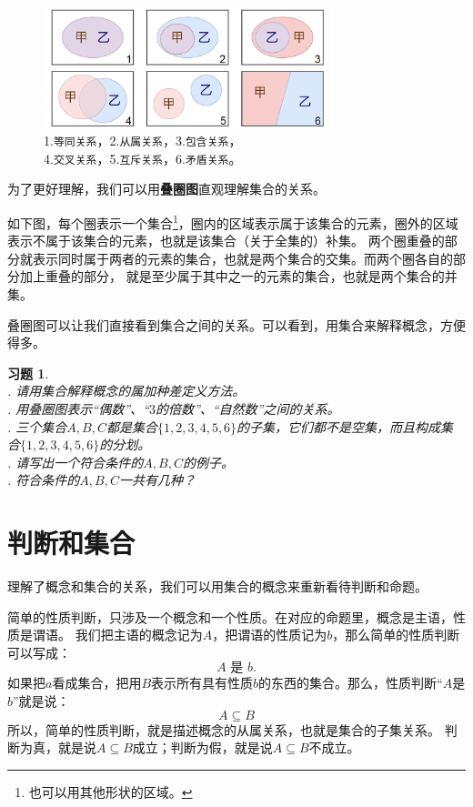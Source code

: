 \documentclass[12pt,UTF8]{ctexbook}
\newtheorem{xt}{习题}[section]
\begin{document}
\begin{figure}[h]
    \vspace{4pt}
    \centering
    \includegraphics[width=0.75\textwidth]{tu/概念的关系1.png}
    \captionsetup{justification=centering}
    \caption*{1.\texttt{等同关系}，2.\texttt{从属关系}，3.\texttt{包含关系}，\\4.\texttt{交叉关系}，5.\texttt{互斥关系}，6.\texttt{矛盾关系}。}
\end{figure}

为了更好理解，我们可以用\textbf{叠圈图}直观理解集合的关系。

如下图，每个圈表示一个集合\footnote{也可以用其他形状的区域。}，圈内的区域表示属于该集合的元素，圈外的区域表示不属于该集合的元素，也就是该集合（关于全集的）补集。
两个圈重叠的部分就表示同时属于两者的元素的集合，也就是两个集合的交集。而两个圈各自的部分加上重叠的部分，
就是至少属于其中之一的元素的集合，也就是两个集合的并集。

叠圈图可以让我们直接看到集合之间的关系。可以看到，用集合来解释概念，方便得多。

\begin{xt}\label{xt:2-0-20}
    \mbox{} \\ 
    . 请用集合解释概念的属加种差定义方法。\\
    . 用叠圈图表示“偶数”、“$3$的倍数”、“自然数”之间的关系。\\
    . 三个集合$A,B,C$都是集合$\{1,2,3,4,5,6\}$的子集，它们都不是空集，而且构成集合$\{1,2,3,4,5,6\}$的分划。\\
    . 请写出一个符合条件的$A,B,C$的例子。\\
    . 符合条件的$A,B,C$一共有几种？
\end{xt}

\section{判断和集合}
理解了概念和集合的关系，我们可以用集合的概念来重新看待判断和命题。

简单的性质判断，只涉及一个概念和一个性质。在对应的命题里，概念是主语，性质是谓语。
我们把主语的概念记为$A$，把谓语的性质记为$b$，那么简单的性质判断可以写成：
$$ A \,\,\mbox{是} \,\,b. $$
如果把$a$看成集合，把用$B$表示所有具有性质$b$的东西的集合。那么，性质判断“$A$是$b$”就是说：
$$A \subseteq B$$
所以，简单的性质判断，就是描述概念的从属关系，也就是集合的子集关系。
判断为真，就是说$A \subseteq B$成立；判断为假，就是说$A \subseteq B$不成立。
\end{document}
